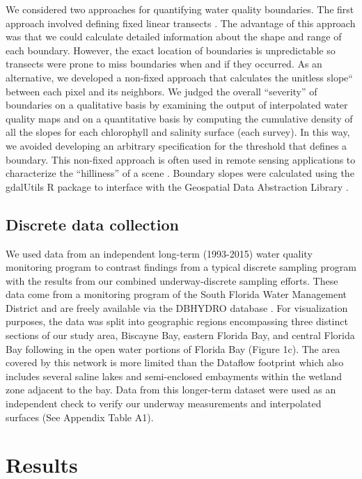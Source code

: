 \documentclass[review]{elsarticle}
\begin{document}
We considered two approaches for quantifying water quality boundaries. The first approach involved defining fixed linear transects \citep{dale2014spatial}. The advantage of this approach was that we could calculate detailed information about the shape and range of each boundary. However, the exact location of boundaries is unpredictable so transects were prone to miss boundaries when and if they occurred. As an alternative, we developed a non-fixed approach that calculates the unitless slope“ between each pixel and its neighbors. We judged the overall “severity” of boundaries on a qualitative basis by examining the output of interpolated water quality maps and on a quantitative basis by computing the cumulative density of all the slopes for each chlorophyll and salinity surface (each survey). In this way, we avoided developing an arbitrary specification for the threshold that defines a boundary. This non-fixed approach is often used in remote sensing applications to characterize the “hilliness” of a scene \citep{jordan2003morphometric}. Boundary slopes were calculated using the gdalUtils R package to interface with the Geospatial Data Abstraction Library \citep{gdalutils, GDAL2017}.

\subsection{Discrete data collection}

We used data from an independent long-term (1993-2015) water quality monitoring program to contrast findings from a typical discrete sampling program with the results from our combined underway-discrete sampling efforts. These data come from a monitoring program of the South Florida Water Management District and are freely available via the DBHYDRO database \citep{dbhydror}. For visualization purposes, the data was split into geographic regions encompassing three distinct sections of our study area, Biscayne Bay, eastern Florida Bay, and central Florida Bay following \citet{boyer_seasonal_1999} in the open water portions of Florida Bay (Figure 1c). The area covered by this network is more limited than the Dataflow footprint which also includes several saline lakes and semi-enclosed embayments within the wetland zone adjacent to the bay. Data from this longer-term dataset were used as an independent check to verify our underway measurements and interpolated surfaces (See Appendix Table A1).

\section{Results}
\end{document}
